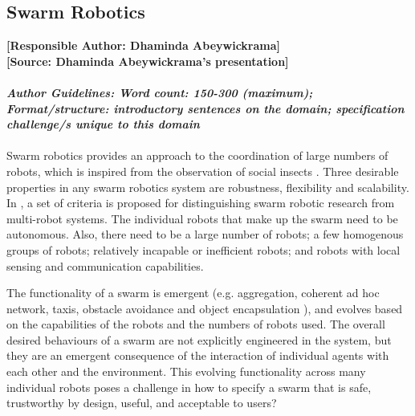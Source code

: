 \documentclass[sigconf]{acmart}
\begin{document}
\subsection{Swarm Robotics}
\textbf{[Responsible Author:  Dhaminda Abeywickrama]}\\
\textbf{[Source: Dhaminda Abeywickrama's presentation]} \\\\
\noindent\textbf{\textit{Author Guidelines: Word count: 150-300 (maximum); \\Format/structure: introductory sentences on the domain; specification challenge/s unique to this domain}}\\\\

Swarm robotics provides an approach to the coordination of large numbers of robots, which is inspired from the observation of social insects \cite{Sahin2005}. 
Three desirable properties in any swarm robotics system are robustness, flexibility and scalability. 
In \cite{Sahin2005}, a set of criteria is proposed for distinguishing swarm robotic research from multi-robot systems. 
The individual robots that make up the swarm need to be autonomous. Also, there need to be a large number of robots; a few homogenous groups of robots; relatively incapable or inefficient robots; and robots with local sensing and communication capabilities. 

The functionality of a swarm is emergent (e.g. aggregation, coherent ad hoc network, taxis, obstacle avoidance and object encapsulation \cite{Winfield2006}), and evolves based on the capabilities of the robots and the numbers of robots used. 
The overall desired behaviours of a swarm are not explicitly engineered in the system, but they are an emergent consequence of the interaction of individual agents with each other and the environment.
This evolving functionality across many individual robots poses a challenge in how to specify a swarm that is safe, trustworthy by design, useful, and acceptable to users?
\end{document}
